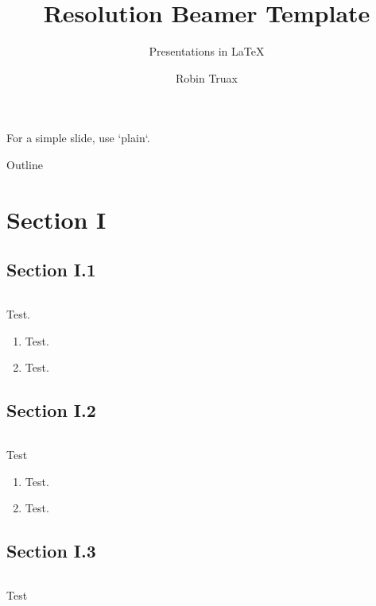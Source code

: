 \documentclass[notheorems, compress]{beamer}
\title{Resolution Beamer Template}
\subtitle{Presentations in LaTeX \subtitleline}
\author{Robin Truax}
\begin{document}
\begin{frame}[plain]
    \titlepage
\end{frame}

\begin{frame}[plain]
    For a simple slide, use `plain`.
\end{frame}

\begin{frame}{Outline}
    \tableofcontents
\end{frame}

\section{Section I}

\subsection{Section I.1}
\begin{frame}{$ $}
     \begin{definition}[Test]\label{def:Test}
         Test.
         \begin{enumerate}
             \item Test.
             \item Test.
         \end{enumerate}
     \end{definition}
\end{frame}

\subsection{Section I.2}
\begin{frame}{$ $}
     \begin{conjecture}[Test]\label{conj:Test}
         Test
         \begin{enumerate}
             \item Test.
             \item Test.
         \end{enumerate}
     \end{conjecture}
\end{frame}

\subsection{Section I.3}
\begin{frame}{$ $}
    \begin{example}[Test]\label{exam:Test}
        Test
    \end{example}
\end{frame}
\end{document}
